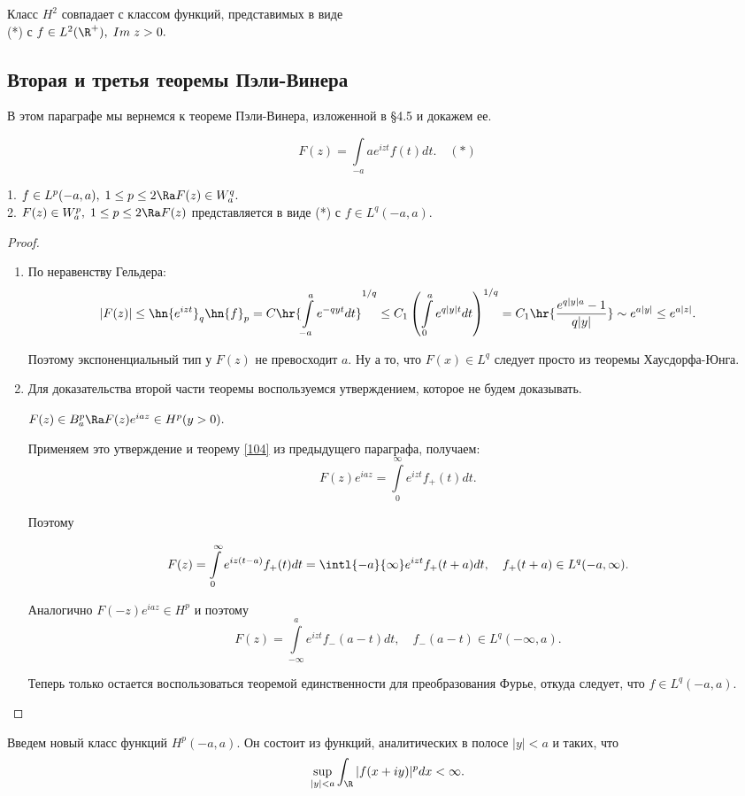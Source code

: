 \documentclass{article}
\begin{document}
\begin{theorem}
Класс $H^2$ совпадает с классом функций, представимых в виде \\\hangindent=6.5cm (*) с $f\in
L^2(\R ^+),\;Im\;z>0.$
\end{theorem}

\subsection{Вторая и третья теоремы Пэли-Винера}
В этом параграфе мы вернемся к теореме Пэли-Винера, изложенной в \S4.5 и докажем ее.

$$F(z)=\int\limits_{-a}a e^{izt}f(t)dt.\quad(*)$$

\begin{theorem}
1. $f\in L^p(-a,a),\;1\le p \le2\Ra F(z)\in W^q_a.$ \\\hangindent=2.5cm 2. $F(z)\in W^p_a,\;1\le
p\le2\Ra F(z)$ представляется в виде (*) с $f\in L^q(-a,a).$
\end{theorem}
\begin{proof}

  \begin{enumerate}
  \item
    По неравенству Гельдера:
    $$|F(z)|\le\hn{e^{izt}}_q\hn{f}_p=C\hr{\int\limits_{-a}^a e^{-qyt}dt}^{1/q}\le C_1\left(\int\limits_0^a
    e^{q|y|t}dt\right)^{1/q}=C_1\hr{\frac{e^{q|y|a}-1}{q|y|}}\sim e^{a|y|}\le e^{a|z|}.$$

    Поэтому экспоненциальный тип у $F(z)$ не превосходит $a.$ Ну а то, что $F(x)\in L^q$ следует просто из
    теоремы Хаусдорфа-Юнга.
  \item
    Для доказательства второй части теоремы воспользуемся утверждением, которое не будем доказывать.

    \begin{stm}
      $F(z)\in B^p_a\Ra F(z)e^{iaz}\in H^p (y>0).$
    \end{stm}

    Применяем это утверждение и теорему \ref{104} из предыдущего параграфа, получаем:
    $$F(z)e^{iaz}=\int\limits_0^{\infty}e^{izt}f_+(t)dt.$$

    Поэтому

    $$F(z)=\int\limits_0^{\infty}e^{iz(t-a)}f_+(t)dt=\intl{-a}{\infty}e^{izt}f_+(t+a)dt,\quad f_+(t+a)\in L^q(-a,\infty).$$

    Аналогично $F(-z)e^{iaz}\in H^p$ и поэтому
    $$F(z)=\int\limits_{-\infty}^a e^{izt}f_-(a-t)dt,\quad f_-(a-t)\in L^q(-\infty,a).$$

    Теперь только остается воспользоваться теоремой единственности для преобразования Фурье, откуда следует, что
    $f\in L^q(-a,a).$

  \end{enumerate}
\end{proof}
Введем новый класс функций $H^p(-a,a)$. Он состоит из функций, аналитических в полосе $|y|<a$ и таких, что
$$\sup_{|y|<a}\int_{\R }|f(x+iy)|^pdx<\infty.$$
\end{document}
